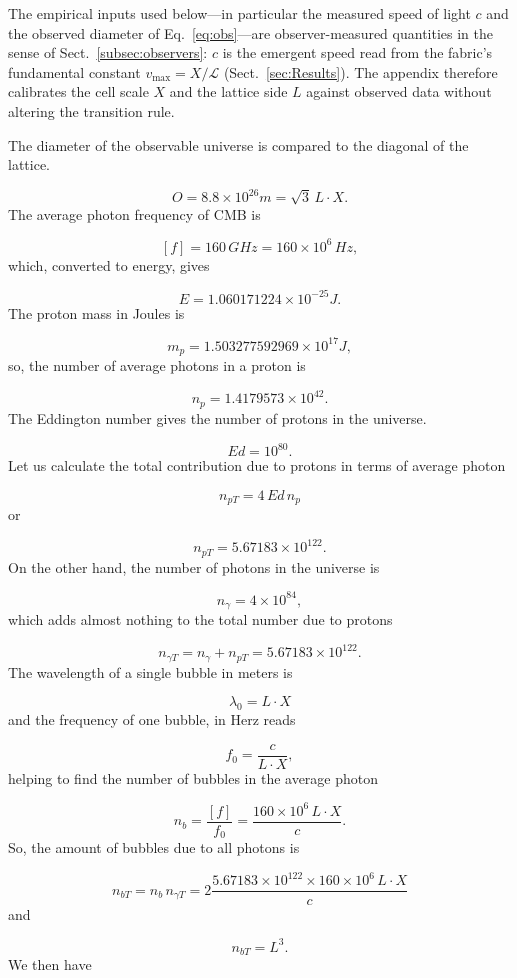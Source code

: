 \documentclass{ijuc}
\begin{document}
The empirical inputs used below---in particular the measured speed of light $c$ and the observed diameter of Eq.~\eqref{eq:obs}---are observer-measured quantities in the sense of Sect.~\ref{subsec:observers}: $c$ is the emergent speed read from the fabric's fundamental constant $v_{\max}=X/\mathcal{L}$ (Sect.~\ref{sec:Results}). The appendix therefore calibrates the cell scale $X$ and the lattice side $L$ against observed data without altering the transition rule.

The diameter of the observable universe \cite{halpbern} is compared
to the diagonal of the lattice.

\begin{equation}
O=8.8\times10^{26}m=\sqrt{3}\,L\cdot X.\label{eq:obs}
\end{equation}
The average photon frequency of CMB \cite{archeops} is

\[
[f]=160\,GHz=160\times10^{6}\,Hz,
\]
which, converted to energy, gives

\[
E=1.060171224\times10^{-25}J.
\]
The proton mass in Joules is

\[
m_{p}=1.503277592969\times10^{17}J,
\]
so, the number of average photons in a proton is

\[
n_{p}=1.4179573\times10^{42}.
\]
The Eddington number gives the number of protons in the universe.

\[
Ed=10^{80}.
\]
Let us calculate the total contribution due to protons in terms of
average photon

\[
n_{pT}=4\,Ed\,n_{p}
\]
or

\[
n_{pT}=5.67183\times10^{122}.
\]
On the other hand, the number of photons in the universe is

\[
n_{\gamma}=4\times10^{84},
\]
which adds almost nothing to the total number due to protons

\[
n_{\gamma T}=n_{\gamma}+n_{pT}=5.67183\times10^{122}.
\]
The wavelength of a single bubble in meters is

\[
\lambda_{0}=L\cdot X
\]
and the frequency of one bubble, in Herz reads

\[
f_{0}=\frac{c}{L\cdot X},
\]
helping to find the number of bubbles in the average photon

\[
n_{b}=\frac{[f]}{f_{0}}=\frac{160\times10^{6}\,L\cdot X}{c}.
\]
So, the amount of bubbles due to all photons is

\[
n_{bT}=n_{b}\,n_{\gamma T}=2\frac{5.67183\times10^{122}\times160\times10^{6}\,L\cdot X}{c}
\]
and

\[
n_{bT}=L^{3}.
\]
We then have
\end{document}
